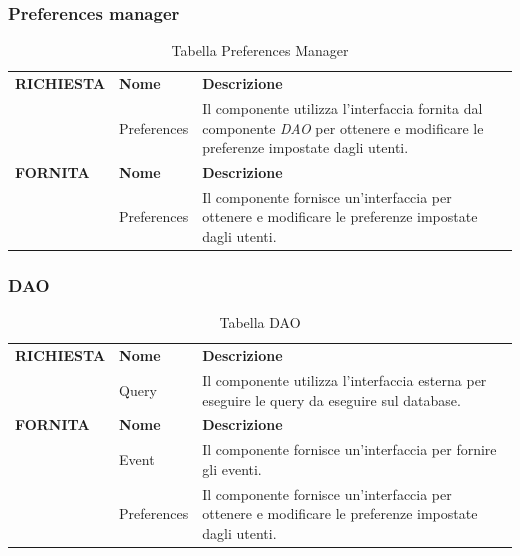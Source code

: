 \documentclass{article}
\begin{document}
\subsubsection{Preferences manager}

\begin{table}[htbp]
    \centering
    \renewcommand{\arraystretch}{1.3} %
    \begin{tabularx}{\textwidth}{| l | l | X |}
        \Xhline{2pt}
        \textbf{RICHIESTA} & \textbf{Nome} & \textbf{Descrizione} \\
        \Xhline{2pt}
         & Preferences & Il componente utilizza l'interfaccia fornita dal componente \textit{DAO} per ottenere e modificare le preferenze impostate dagli utenti. \\
        \Xhline{2pt}
        \textbf{FORNITA} & \textbf{Nome} & \textbf{Descrizione} \\
        \Xhline{2pt}
         & Preferences & Il componente fornisce un'interfaccia per ottenere e modificare le preferenze impostate dagli utenti. \\
        \hline
    \end{tabularx}
    \caption{Tabella Preferences Manager}
\end{table}

\clearpage

\subsubsection{DAO}

\begin{table}[htbp]
    \centering
    \renewcommand{\arraystretch}{1.3} %
    \begin{tabularx}{\textwidth}{| l | l | X |}
        \Xhline{2pt}
        \textbf{RICHIESTA} & \textbf{Nome} & \textbf{Descrizione} \\
        \Xhline{2pt}
         & Query & Il componente utilizza l'interfaccia esterna per eseguire le query da eseguire sul database. \\
        \Xhline{2pt}
        \textbf{FORNITA} & \textbf{Nome} & \textbf{Descrizione} \\
        \Xhline{2pt}
         & Event & Il componente fornisce un'interfaccia per fornire gli eventi. \\
        \hline
         & Preferences & Il componente fornisce un'interfaccia per ottenere e modificare le preferenze impostate dagli utenti. \\
        \hline
    \end{tabularx}
    \caption{Tabella DAO}
\end{table}
\end{document}
